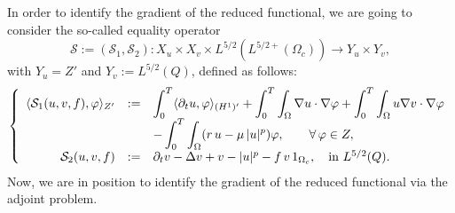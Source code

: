 \documentclass[11pt,reqno]{amsart}%
\numberwithin{equation}{section}
\begin{document}
In order to identify the gradient of the reduced functional, we are going to consider the so-called equality operator 
$$\mathcal{S}:=(\mathcal{S}_1,\mathcal{S}_2):
{X}_{u}  \times {X}_{v} \times L^{5/2}(L^{5/2+}(\Omega_c))
\to Y_u \times Y_v ,$$ 
with $Y_u=Z'$ and $Y_v:=L^{5/2}(Q)$, 
defined as follows:
\begin{equation}\label{oper-s}
\left\{
\begin{array}{rcl}
\langle\mathcal{S}_1(u,v,f),\varphi\rangle_{Z'}
&:=&\displaystyle\int_0^T\langle\partial_t u, \varphi\rangle_{(H^1)'}
+\int_0^T\int_\Omega\nabla u\cdot\nabla \varphi 
+\int_0^T\int_\Omega u\nabla v\cdot\nabla \varphi
\\
&&-\displaystyle\int_0^T\int_\Omega(r\,u-\mu\, |u|^p) \varphi,\qquad \forall \,\varphi\in Z,
\\
\mathcal{S}_2(u,v,f)&:=&\partial_tv-\Delta v+v-|u|^p-f\,v\,1_{\Omega_c}
,\quad \hbox{in $L^{5/2}(Q)$}.
\end{array}
\right.
\end{equation}
%
Now, we are in position to identify the gradient of the reduced functional via the adjoint problem. 
\end{document}
